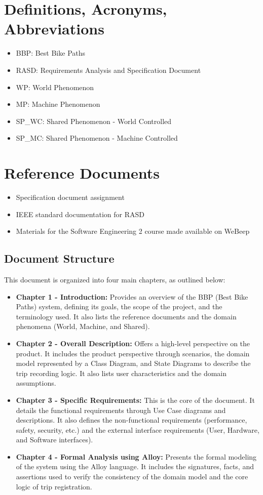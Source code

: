 \section{Definitions, Acronyms, Abbreviations}
\begin{itemize}
	\item BBP: Best Bike Paths
	\item RASD: Requirements Analysis and Specification Document
	\item WP: World Phenomenon
	\item MP: Machine Phenomenon
	\item SP\_WC: Shared Phenomenon - World Controlled
	\item SP\_MC: Shared Phenomenon - Machine Controlled
\end{itemize}

\section{Reference Documents}
\begin{itemize}
	\item Specification document assignment
	\item IEEE standard documentation for RASD
	\item Materials for the Software Engineering 2 course made available on WeBeep
\end{itemize}
\subsection{Document Structure}
This document is organized into four main chapters, as outlined below:

\begin{itemize}
    \item \textbf{Chapter 1 - Introduction:} Provides an overview of the BBP (Best Bike Paths) system, defining its goals, the scope of the project, and the terminology used. It also lists the reference documents and the domain phenomena (World, Machine, and Shared).
    
    \item \textbf{Chapter 2 - Overall Description:} Offers a high-level perspective on the product. It includes the product perspective through scenarios, the domain model represented by a Class Diagram, and State Diagrams to describe the trip recording logic. It also lists user characteristics and the domain assumptions.
    
    \item \textbf{Chapter 3 - Specific Requirements:} This is the core of the document. It details the functional requirements through Use Case diagrams and descriptions. It also defines the non-functional requirements (performance, safety, security, etc.) and the external interface requirements (User, Hardware, and Software interfaces).
    
    \item \textbf{Chapter 4 - Formal Analysis using Alloy:} Presents the formal modeling of the system using the Alloy language. It includes the signatures, facts, and assertions used to verify the consistency of the domain model and the core logic of trip registration.
\end{itemize}